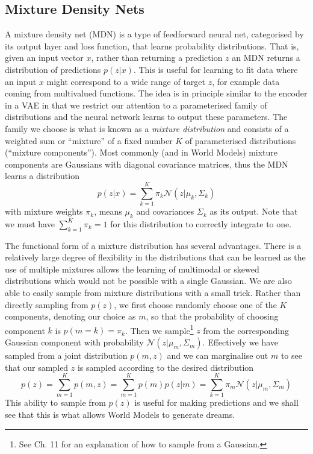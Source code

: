 \documentclass{article}
\numberwithin{figure}{section}
\theoremstyle{definition}
\begin{document}
\subsection{Mixture Density Nets}
A mixture density net (MDN) is a type of feedforward neural net, categorised by its output layer and loss function, that learns probability distributions.
That is, given an input vector $x$, rather than returning a prediction $z$ an MDN returns a distribution of predictions $p(z|x)$.
This is useful for learning to fit data where an input $x$ might correspond to a wide range of target $z$, for example data coming from multivalued functions.
The idea is in principle similar to the encoder in a VAE in that we restrict our attention to a parameterised family of distributions and the neural network learns to output these parameters.
The family we choose is what is known as a \textit{mixture distribution} and consists of a weighted sum or ``mixture'' of a fixed number $K$ of parameterised distributions (``mixture components'').
Most commonly (and in World Models) mixture components are Gaussians with diagonal covariance matrices, thus the MDN learns a distribution
$$p(z|x) = \sum_{k=1}^K \pi_k \mathcal{N}\left(z|\mu_k, \Sigma_k\right)$$
with mixture weights $\pi_k$, means $\mu_k$ and covariances $\Sigma_k$ as its output.
Note that we must have $\sum_{k=1}^K \pi_k = 1$ for this distribution to correctly integrate to one.



The functional form of a mixture distribution has several advantages.
There is a relatively large degree of flexibility in the distributions that can be learned as the use of multiple mixtures allows the learning of multimodal or skewed distributions which would not be possible with a single Gaussian.
We are also able to easily sample from mixture distributions with a small trick.
Rather than directly sampling from $p(z)$, we first choose randomly choose one of the $K$ components, denoting our choice as $m$, so that the probability of choosing component $k$ is $p(m=k) =\pi_k$. 
Then we sample\footnote{See \cite{bishop2006pattern} Ch. 11 for an explanation of how to sample from a Gaussian.} $z$ from the corresponding Gaussian component with probability $\mathcal{N}(z| \mu_m, \Sigma_m)$.
Effectively we have sampled from a joint distribution $p(m,z)$ and we can marginalise out $m$ to see that our sampled $z$ is sampled according to the desired distribution
$$p(z) = \sum_{m=1}^K p(m,z) = \sum_{m=1}^K p(m)p(z|m) = \sum_{k=1}^K \pi_m \mathcal{N}\left(z|\mu_m, \Sigma_m\right)$$
This ability to sample from $p(z)$ is useful for making predictions and we shall see that this is what allows World Models to generate dreams.
\end{document}
